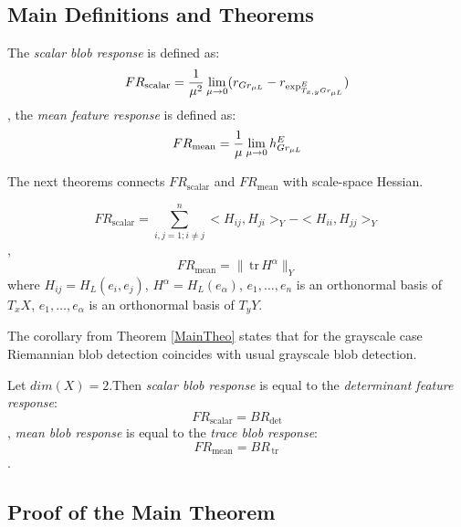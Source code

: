 \documentclass{llncs}
\newcommand{\TangentSpaceArg}[2]{{T_{#2}}{#1}}
\newcommand{\FRScalar}{FR_{\mathrm{scalar}}}
\newcommand{\FRMean}{FR_{\mathrm{mean}}}
\newcommand {\tr}{{\,}\mathrm{tr}{\,}}
\begin{document}
\subsection{Main Definitions and Theorems}

\begin{definition} \label{RiemanDef}
The \emph{scalar blob response} is defined as:
$$\FRScalar=\frac{1}{\mu ^ 2}\lim_{\mu\to 0} ( r_{Gr_{\mu L}} - r_{\tensor*{\exp}{^E_{\TangentSpaceArg{Gr_{\mu L}}{x,y}}}} )$$,
the \emph{mean feature response} is defined as:
$$\FRMean=\frac{1}{\mu}\lim_{\mu\to 0} \tensor*{h}{^E_{Gr_{\mu L}}}$$
\end{definition}

The next theorems connects $\FRScalar$ and $\FRMean$ with scale-space Hessian.

\begin{theorem} \label{MainTheo}
$$\FRScalar=\sum_{i,j=1; i\ne j}^{n}{<H_{ij},H_{ji}>_Y-<H_{ii},H_{jj}>_Y}$$,
$$\FRMean=\|\tr H^\alpha\|_Y$$
where $H_{ij}=H_L (e_i,e_j)$, $H^\alpha=H_L (e_\alpha)$, 
$e_1,\dots,e_n$ is an orthonormal basis of $\TangentSpaceArg{X}{x}$, $e_1,\dots,e_\alpha$ is an orthonormal basis of $\TangentSpaceArg{Y}{y}$.
\end{theorem}

The corollary from Theorem \ref{MainTheo} states that for the grayscale case Riemannian blob detection coincides with usual grayscale blob detection.

\begin{corollary}\label{GrayscaleCol}
Let $dim(X)=2$.Then \emph{scalar blob response} is equal to the \emph{determinant feature response}:
$$\FRScalar=BR_{\det}$$,
\emph{mean blob response} is equal to the \emph{trace blob response}:
$$\FRMean=BR_{\tr}$$.
\end{corollary}

\subsection{Proof of the Main Theorem}
\end{document}
